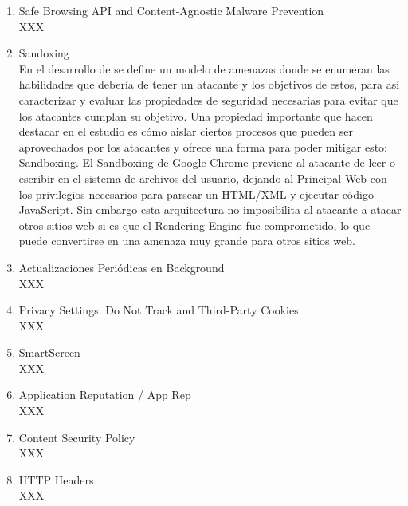     \begin{enumerate}
        \item Safe Browsing API and Content-Agnostic Malware Prevention
        \\XXX 

        \item Sandoxing
        \\En el desarrollo de \cite{barth2008security} se define un modelo de amenazas donde se enumeran las habilidades que debería de tener un atacante y los objetivos de estos, para así caracterizar y evaluar las propiedades de seguridad necesarias para evitar que los atacantes cumplan su objetivo. Una propiedad importante que hacen destacar en el estudio es cómo aislar ciertos procesos que pueden ser aprovechados por los atacantes y ofrece una forma para poder mitigar esto: Sandboxing. El Sandboxing de Google Chrome previene al atacante de leer o escribir en el sistema de archivos del usuario, dejando al Principal Web con los privilegios necesarios para parsear un HTML/XML y ejecutar código JavaScript. Sin embargo esta arquitectura no imposibilita al atacante a atacar otros sitios web si es que el Rendering Engine fue comprometido, lo que puede convertirse en una amenaza muy grande para otros sitios web.

        \item Actualizaciones Periódicas en Background
        \\XXX

        \item Privacy Settings: Do Not Track and Third-Party Cookies
        \\XXX


        \item SmartScreen
        \\XXX
        
        \item Application Reputation / App Rep
        \\XXX


        \item Content Security Policy
        \\XXX


        \item HTTP Headers
        \\XXX

    \end{enumerate}


